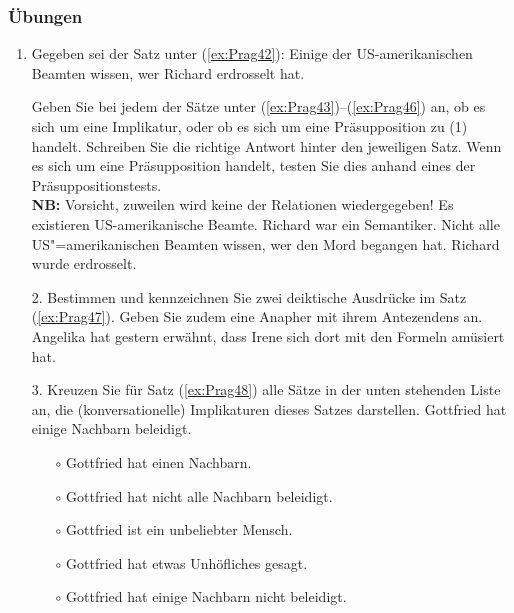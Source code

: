 \begin{frame}[shrink]
\frametitle{Übungen}

	\begin{enumerate}
		\item Gegeben sei der Satz unter (\ref{ex:Prag42}):
		\ea \label{ex:Prag42}
			Einige der US-amerikanischen Beamten wissen, wer Richard erdrosselt hat.
		\z
		\item [] Geben Sie bei jedem der Sätze unter (\ref{ex:Prag43})--(\ref{ex:Prag46}) an, ob es sich um eine Implikatur, oder ob es sich um eine Präsupposition zu (1) handelt. Schreiben Sie die richtige Antwort hinter den jeweiligen Satz. Wenn es sich um eine Präsupposition handelt, testen Sie dies anhand eines der Präsuppositionstests. \\
		\textbf{NB:} Vorsicht, zuweilen wird keine der Relationen wiedergegeben!
		\ea\label{ex:Prag43} Es existieren US-amerikanische Beamte.
		\ex\label{ex:Prag44} Richard war ein Semantiker.
		\ex\label{ex:Prag45} Nicht alle US"=amerikanischen Beamten wissen, wer den Mord begangen hat.
		\ex\label{ex:Prag46} Richard wurde erdrosselt.
		\z	
	\end{enumerate}

\end{frame}


\begin{frame}
	\begin{enumerate}
		\item[2.] Bestimmen und kennzeichnen Sie zwei deiktische Ausdrücke im Satz (\ref{ex:Prag47}). Geben Sie zudem eine Anapher mit ihrem Antezendens an.
		\ea\label{ex:Prag47} Angelika hat gestern erwähnt, dass Irene sich dort mit den Formeln amüsiert hat.
		\z 
		\item[3.] Kreuzen Sie für Satz (\ref{ex:Prag48}) alle Sätze in der unten stehenden Liste an, die (konversationelle) Implikaturen dieses Satzes darstellen.
		\ea \label{ex:Prag48} Gottfried hat einige Nachbarn beleidigt.
		\z 
		\begin{itemize}
			\item[$\circ$] Gottfried hat einen Nachbarn.
			\item[$\circ$] Gottfried hat nicht alle Nachbarn beleidigt.
			\item[$\circ$] Gottfried ist ein unbeliebter Mensch.
			\item[$\circ$] Gottfried hat etwas Unhöfliches gesagt.
			\item[$\circ$] Gottfried hat einige Nachbarn nicht beleidigt.
		\end{itemize}
	\end{enumerate}
\end{frame}

